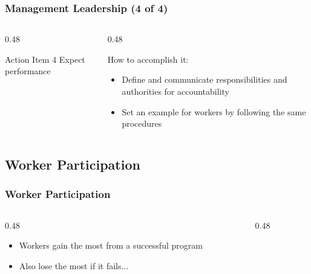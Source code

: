 \begin{frame}
    \frametitle{Management Leadership (4 of 4)}
    \begin{columns}[t]
        \begin{column}{0.48\linewidth}
            \begin{block}{Action Item 4}
                Expect performance
            \end{block}
        \end{column}
        \begin{column}{0.48\linewidth}
            \begin{block}{How to accomplish it:}
                \begin{itemize}[<+- | alert@+>]
                    \item Define and communicate responsibilities and authorities for accountability
                    \item Set an example for workers by following the same procedures
                \end{itemize}
            \end{block}
        \end{column}
    \end{columns}
\end{frame}

\subsection{Worker Participation}

\begin{frame}
    \frametitle{Worker Participation}
    \begin{columns}
        \begin{column}{0.48\linewidth}
            \begin{itemize}[<+- | alert@+>]
                \item Workers gain the most from a successful program
                \item Also lose the most if it fails...
            \end{itemize}
        \end{column}
        \begin{column}{0.48\linewidth}
        \end{column}
    \end{columns}
\end{frame}

